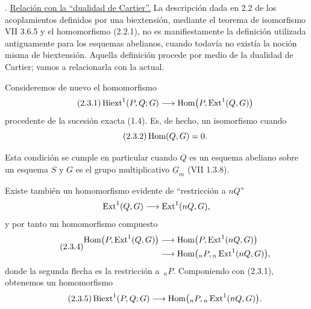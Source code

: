 \par\medskip{}. \underline{Relación con la ``dualidad de Cartier''.}
La descripción dada en 2.2 de los acoplamientos definidos por una
biextensión, mediante el teorema de isomorfismo VII 3.6.5 y el
homomorfismo (2.2.1), no es manifiestamente la definición utilizada
antiguamente para los esquemas abelianos, cuando todavía no existía la
noción misma de biextensión. Aquella definición procede por medio de
la dualidad de Cartier; vamos a relacionarla con la actual.

Consideremos de nuevo el homomorfismo
\begin{equation}\tag{2.3.1}
 \operatorname{Biext}^1(P,Q;G)
 \longrightarrow
 \operatorname{Hom}\bigl(P,\operatorname{Ext}^1(Q,G)\bigr)
\end{equation}
procedente de la sucesión exacta (1.4). Es, de hecho, un isomorfismo
cuando
\begin{equation}\tag{2.3.2}
 \operatorname{Hom}(Q,G)=0.
\end{equation}


Esta condición se cumple en particular cuando $Q$ es un esquema
abeliano sobre un esquema $S$ y $G$ es el grupo multiplicativo
$\underline G_m$ (VII 1.3.8).

Existe también un homomorfismo evidente de ``restricción a $nQ$''
\[
 \operatorname{Ext}^1(Q,G)\longrightarrow\operatorname{Ext}^1(nQ,G),
\]
y por tanto un homomorfismo compuesto
\begin{equation}\tag{2.3.4}
\begin{split}
 \operatorname{Hom}\bigl(P,\operatorname{Ext}^1(Q,G)\bigr)
 &\longrightarrow
 \operatorname{Hom}\bigl(P,\operatorname{Ext}^1(nQ,G)\bigr)\\
 &\longrightarrow
 \operatorname{Hom}\bigl({}_nP,{}_n\operatorname{Ext}^1(nQ,G)\bigr),
\end{split}
\end{equation}
donde la segunda flecha es la restricción a $\,{}_nP$. Componiendo con
(2.3.1), obtenemos un homomorfismo
\begin{equation}\tag{2.3.5}
 \operatorname{Biext}^1(P,Q;G)
 \longrightarrow
 \operatorname{Hom}\bigl({}_nP,{}_n\operatorname{Ext}^1(nQ,G)\bigr).
\end{equation}

